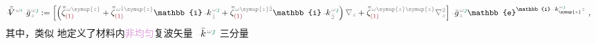 \begin{subequations}
\begin{align}
	\Xint{\mathcolor{gray}{-}}{25}{\bar{\bar{V}}}^{\;\! \mathcolor{gray}{\omega} \textcolor{PineGreen}{\imath}} \Xint{{}^{}_{\mathcolor{gray}{-}}}{10}{\bar{g}}^{\;\!\mathcolor{gray}{\omega} \textcolor{PineGreen}{\jmath}}_{\;\! \mathcolor{gray}{z}} &:= \left[ \left( \bar{\bar{\zeta}}^{\;\! \mathcolor{gray}{\omega} \mathcolor{gray}{\symup{z}}}_{\textcolor{Maroon}{(1)}} + \bar{\bar{\zeta}}^{\;\! \mathcolor{gray}{\omega} \mathcolor{gray}{\check{1} \symup{z}}}_{\textcolor{Maroon}{(1)}} \mathbb{i} \Xint{\begin{smallmatrix} ~ \\ {}^{}_{\mathcolor{gray}{-}} \\ ~ \end{smallmatrix}}{15}{k}_{\;\! \mathcolor{gray}{\check{1}}}^{\;\! \mathcolor{gray}{\omega} \textcolor{PineGreen}{\jmath}} + \bar{\bar{\zeta}}^{\;\! \mathcolor{gray}{\omega} \mathcolor{gray}{\symup{z} \check{2}}}_{\textcolor{Maroon}{(1)}} \mathbb{i} \Xint{\begin{smallmatrix} ~ \\ {}^{}_{\mathcolor{gray}{-}} \\ ~ \end{smallmatrix}}{15}{k}_{\;\! \mathcolor{gray}{\check{2}}}^{\;\! \mathcolor{gray}{\omega} \textcolor{PineGreen}{\jmath}} \right) \mathcolor{gray}{\nabla_z} + \bar{\bar{\zeta}}^{\;\! \mathcolor{gray}{\omega} \mathcolor{gray}{\symup{z} \symup{z}}}_{\textcolor{Maroon}{(1)}} \mathcolor{gray}{\nabla_z^2} \right] \Xint{{}^{}_{\mathcolor{gray}{-}}}{10}{\bar{g}}^{\;\!\mathcolor{gray}{\omega} \textcolor{PineGreen}{\jmath}}_{\;\! \mathcolor{gray}{z}} \mathbb{e}^{\mathbb{i} \Xint{\begin{smallmatrix} ~ \\ {}^{}_{\mathcolor{gray}{-}} \\ ~ \end{smallmatrix}}{15}{k}_{\symup{z}}^{\;\! \mathcolor{gray}{\omega} \textcolor{PineGreen}{\jmath}} \mathcolor{gray}{z}} ~, \label{eq:plane_wave_basis_eq-left_V}
\end{align}
\end{subequations}
其中，类似  地定义了材料内\textcolor{Plum}{非均匀}\cite{wangComplexRayTracing2008a,changRayTracingAbsorbing2005,sturmElectromagneticWavesCrystals2024}复\textcolor{PineGreen}{波矢}量 $\Xint{\begin{smallmatrix} ~ \\ {}^{}_{\mathcolor{gray}{-}} \\ ~ \end{smallmatrix}}{15}{\bar{k}}^{\;\! \mathcolor{gray}{\omega} \textcolor{PineGreen}{\jmath}}$ 三分量\cite{xieAnalytic3DVector}
